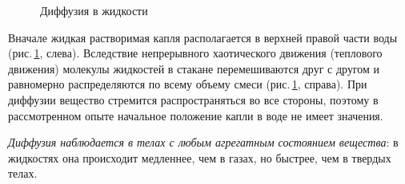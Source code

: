 \documentclass[main.tex]{subfiles}
\begin{document}
\begin{figure}[H]
\caption{Диффузия в жидкости}
\label{fig:p67}
\end{figure}


Вначале жидкая растворимая капля располагается в верхней правой части воды (рис.\,\ref{fig:p67}, слева). Вследствие непрерывного хаотического движения (теплового движения) молекулы жидкостей в стакане перемешиваются друг с другом и равномерно распределяются по всему объему смеси (рис.\,\ref{fig:p67}, справа). При диффузии вещество стремится распространяться во все стороны, поэтому в рассмотренном опыте начальное положение капли в воде не имеет значения. 

\emph{Диффузия наблюдается в телах с любым агрегатным состоянием вещества}: в жидкостях она происходит медленнее, чем в газах, но быстрее, чем в твердых телах. 
\end{document}
